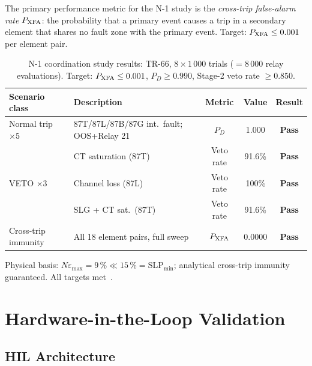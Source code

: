 The primary performance metric for the N-1 study is the \emph{cross-trip
false-alarm rate} $P_{\rm XFA}$: the probability that a primary event
causes a trip in a secondary element that shares no fault zone with the
primary event.  Target: $P_{\rm XFA} \leq 0.001$ per element pair.

\begin{table}[htbp]
\centering
\caption{N-1 coordination study results: TR-66, $8 \times 1\,000$ trials
         ($= 8\,000$ relay evaluations).
         Target: $P_{\rm XFA} \leq 0.001$, $P_D \geq 0.990$,
         Stage-2 veto rate $\geq 0.850$.}
\label{tab:ch7_n1_results}
\renewcommand{\arraystretch}{1.08}
\begin{tabularx}{\textwidth}{@{}lXccc@{}}
\toprule
Scenario class & Description & Metric & Value & Result \\
\midrule
Normal trip $\times 5$ & 87T/87L/87B/87G int.\ fault; OOS+Relay 21 & $P_D$ & 1.000 & \textbf{Pass} \\
\midrule
\multirow{3}{*}{VETO $\times 3$} & CT saturation (87T) & Veto rate & 91.6\% & \textbf{Pass} \\
                                  & Channel loss (87L)  & Veto rate & 100\%  & \textbf{Pass} \\
                                  & SLG + CT sat.\ (87T) & Veto rate & 91.6\% & \textbf{Pass} \\
\midrule
Cross-trip immunity & All 18 element pairs, full sweep & $P_{\rm XFA}$ & 0.0000 & \textbf{Pass} \\
\bottomrule
\end{tabularx}
\smallskip\noindent\footnotesize
Physical basis: $N\varepsilon_{\max} = 9\,\% \ll 15\,\% = \mathrm{SLP}_{\min}$;
analytical cross-trip immunity guaranteed. All targets met~\cite{SAMBP_TR66}.
\end{table}

\section{Hardware-in-the-Loop Validation}
\label{sec:ch7_hil}

\subsection{HIL Architecture}

